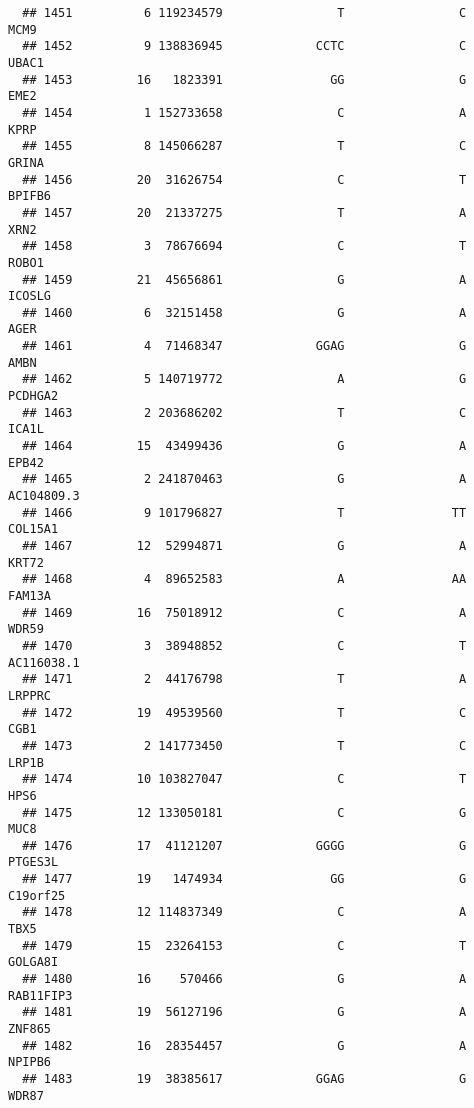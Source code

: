 \documentclass[12pt,twoside]{reedthesis}
\theoremstyle{definition}
\theoremstyle{definition}
\theoremstyle{remark}
\begin{document}
\begin{verbatim}
  ## 1451          6 119234579                T                C           MCM9
  ## 1452          9 138836945             CCTC                C          UBAC1
  ## 1453         16   1823391               GG                G           EME2
  ## 1454          1 152733658                C                A           KPRP
  ## 1455          8 145066287                T                C          GRINA
  ## 1456         20  31626754                C                T         BPIFB6
  ## 1457         20  21337275                T                A           XRN2
  ## 1458          3  78676694                C                T          ROBO1
  ## 1459         21  45656861                G                A         ICOSLG
  ## 1460          6  32151458                G                A           AGER
  ## 1461          4  71468347             GGAG                G           AMBN
  ## 1462          5 140719772                A                G        PCDHGA2
  ## 1463          2 203686202                T                C          ICA1L
  ## 1464         15  43499436                G                A          EPB42
  ## 1465          2 241870463                G                A     AC104809.3
  ## 1466          9 101796827                T               TT        COL15A1
  ## 1467         12  52994871                G                A          KRT72
  ## 1468          4  89652583                A               AA         FAM13A
  ## 1469         16  75018912                C                A          WDR59
  ## 1470          3  38948852                C                T     AC116038.1
  ## 1471          2  44176798                T                A         LRPPRC
  ## 1472         19  49539560                T                C           CGB1
  ## 1473          2 141773450                T                C          LRP1B
  ## 1474         10 103827047                C                T           HPS6
  ## 1475         12 133050181                C                G           MUC8
  ## 1476         17  41121207             GGGG                G        PTGES3L
  ## 1477         19   1474934               GG                G       C19orf25
  ## 1478         12 114837349                C                A           TBX5
  ## 1479         15  23264153                C                T        GOLGA8I
  ## 1480         16    570466                G                A      RAB11FIP3
  ## 1481         19  56127196                G                A         ZNF865
  ## 1482         16  28354457                G                A         NPIPB6
  ## 1483         19  38385617             GGAG                G          WDR87

\end{verbatim}
\end{document}
